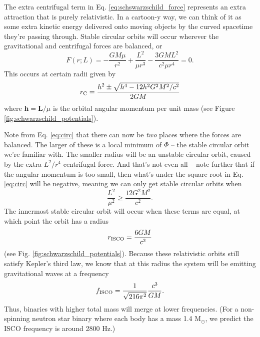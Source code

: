 \documentclass[11pt]{article}
\begin{document}
\begin{enumerate}
\hspace{15pt} The extra centrifugal term in Eq. \ref{eq:schswarzschild_force} represents an extra attraction that is purely relativistic. In a cartoon-y way, we can think of it as some extra kinetic energy delivered onto moving objects by the curved spacetime they're passing through. Stable circular orbits will occur wherever the gravitational and centrifugal forces are balanced, or
\[ F(r; L) = -\frac{GM\mu}{r^2} + \frac{L^2}{\mu r^3} - \frac{3GML^2}{c^2\mu r^4} = 0. \]
This occurs at certain radii given by
\begin{equation}\label{eq:circ}
r_{\rm C} = \frac{h^2 \pm \sqrt{h^4 - 12h^2G^2M^2/c^2}}{2GM}
\end{equation}
where $\mathbf{h} = \mathbf{L}/\mu$ is the orbital angular momentum per unit mass (see Figure \ref{fig:schwarzschild_potentials}).

\hspace{15pt} Note from Eq. \ref{eq:circ} that there can now be \emph{two} places where the forces are balanced. The larger of these is a local minimum of $\Phi$ -- the stable circular orbit we're familiar with. The smaller radius will be an unstable circular orbit, caused by the extra $L^2/r^4$ centrifugal force. And that's not even all -- note further that if the angular momentum is too small, then what's under the square root in Eq. \ref{eq:circ} will be negative, meaning we can only get stable circular orbits when
\begin{equation}
\frac{L^2}{\mu^2} \geq \frac{12G^2M^2}{c^2}.
\end{equation}
The innermost stable circular orbit will occur when these terms are equal, at which point the orbit has a radius
\begin{equation}
r_{\rm ISCO} = \frac{6GM}{c^2}
\end{equation}
(see Fig. \ref{fig:schwarzschild_potentials}). Because these relativistic orbits still satisfy Kepler's third law, we know that at this radius the system will be emitting gravitational waves at a frequency
\[ f_{\rm ISCO} = \frac{1}{\sqrt{216\pi^2}} \frac{c^3}{GM}. \]
Thus, binaries with higher total mass will merge at lower frequencies. (For a non-spinning neutron star binary where each body has a mass 1.4 M$_{\odot}$, we predict the ISCO frequency is around 2800 Hz.)


\end{enumerate}
\end{document}
